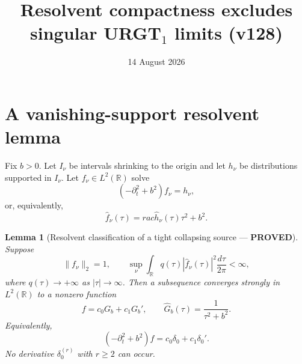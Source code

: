 \documentclass[11pt]{article}
\title{Resolvent compactness excludes singular URGT$_1$ limits (v128)}
\date{14 August 2026}
\newcommand{\PROVED}{\textcolor{green!40!black}{\textbf{PROVED}}}
\newtheorem{lemma}{Lemma}
\begin{document}
\maketitle

\section{A vanishing-support resolvent lemma}

Fix $b>0$.  Let $I_\nu$ be intervals shrinking to the origin and let
$h_\nu$ be distributions supported in $I_\nu$.  Let $f_\nu\in L^2(\mathbb
R)$ solve
\begin{equation}
 (-\partial_t^2+b^2)f_\nu=h_\nu,                            \tag{1}
\end{equation}
or, equivalently,
\begin{equation}
 \widehat f_\nu(\tau)=rac{\widehat h_\nu(\tau)}
                            {\tau^2+b^2}.                   \tag{2}
\end{equation}

\begin{lemma}[Resolvent classification of a tight collapsing source ---
\PROVED]
Suppose
\begin{equation}
 \|f_\nu\|_2=1,
 \qquad
 \sup_\nu\int_{\mathbb R}q(\tau)|\widehat f_\nu(\tau)|^2
                 \frac{d\tau}{2\pi}<\infty,               \tag{3}
\end{equation}
where $q(\tau)\to+\infty$ as $|\tau|\to\infty$.  Then a subsequence
converges strongly in $L^2(\mathbb R)$ to a nonzero function
\begin{equation}
 f=c_0G_b+c_1G_b',
 \qquad
 \widehat G_b(\tau)=\frac1{\tau^2+b^2}.                    \tag{4}
\end{equation}
Equivalently,
\begin{equation}
 (-\partial_t^2+b^2)f=c_0\delta_0+c_1\delta_0'.            \tag{5}
\end{equation}
No derivative $\delta_0^{(r)}$ with $r\ge2$ can occur.
\end{lemma}
\end{document}
